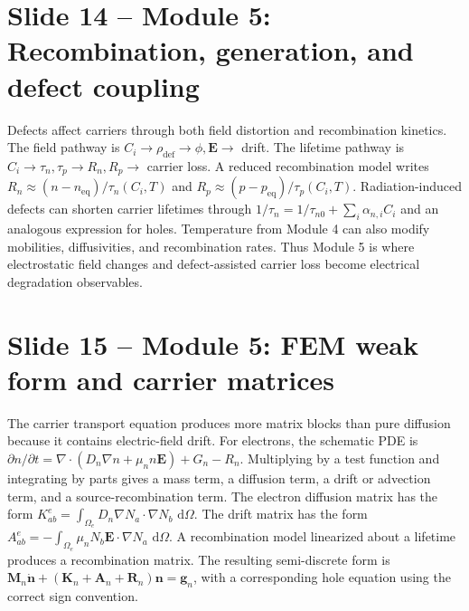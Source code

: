 \documentclass[11pt]{article}
\newcommand{\dd}{\,\mathrm{d}}
\newcommand{\grad}{\nabla}
\newcommand{\divg}{\nabla\!\cdot}
\newcommand{\E}{\bm{E}}
\newcommand{\mat}[1]{\mathbf{#1}}
\newcommand{\vect}[1]{\bm{#1}}
\begin{document}
\section*{Slide 14 -- Module 5: Recombination, generation, and defect coupling}
\begin{scriptbox}
Defects affect carriers through both field distortion and recombination kinetics. The field pathway is \(C_i\rightarrow\rho_{\mathrm{def}}\rightarrow\phi,\E\rightarrow\) drift. The lifetime pathway is \(C_i\rightarrow\tau_n,\tau_p\rightarrow R_n,R_p\rightarrow\) carrier loss. A reduced recombination model writes \(R_n\approx(n-n_{\mathrm{eq}})/\tau_n(C_i,T)\) and \(R_p\approx(p-p_{\mathrm{eq}})/\tau_p(C_i,T)\). Radiation-induced defects can shorten carrier lifetimes through \(1/\tau_n=1/\tau_{n0}+\sum_i\alpha_{n,i}C_i\) and an analogous expression for holes. Temperature from Module 4 can also modify mobilities, diffusivities, and recombination rates. Thus Module 5 is where electrostatic field changes and defect-assisted carrier loss become electrical degradation observables.
\end{scriptbox}

\section*{Slide 15 -- Module 5: FEM weak form and carrier matrices}
\begin{scriptbox}
The carrier transport equation produces more matrix blocks than pure diffusion because it contains electric-field drift. For electrons, the schematic PDE is \(\partial n/\partial t=\divg(D_n\grad n+\mu_nn\E)+G_n-R_n\). Multiplying by a test function and integrating by parts gives a mass term, a diffusion term, a drift or advection term, and a source-recombination term. The electron diffusion matrix has the form \(K^e_{ab}=\int_{\Omega_e}D_n\grad N_a\cdot\grad N_b\,\dd\Omega\). The drift matrix has the form \(A^e_{ab}=-\int_{\Omega_e}\mu_nN_b\E\cdot\grad N_a\,\dd\Omega\). A recombination model linearized about a lifetime produces a recombination matrix. The resulting semi-discrete form is \(\mat{M}_n\dot{\vect{n}}+(\mat{K}_n+\mat{A}_n+\mat{R}_n)\vect{n}=\vect{g}_n\), with a corresponding hole equation using the correct sign convention.
\end{scriptbox}
\end{document}
